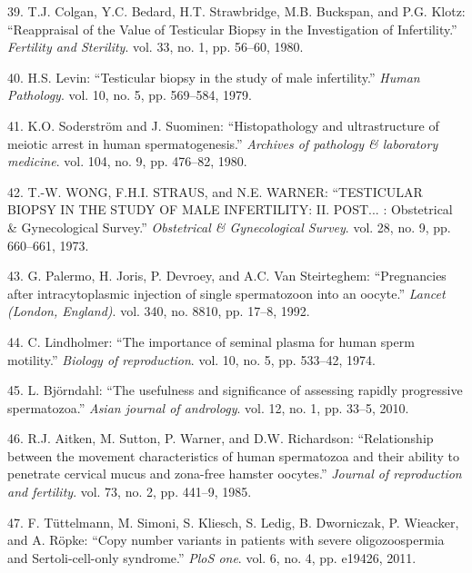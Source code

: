 \documentclass[12pt,twoside]{reedthesis}
\theoremstyle{definition}
\theoremstyle{definition}
\theoremstyle{remark}
\begin{document}
  \hypertarget{ref-Colgan1980}{}
  39. T.J. Colgan, Y.C. Bedard, H.T. Strawbridge, M.B. Buckspan, and P.G.
  Klotz: ``Reappraisal of the Value of Testicular Biopsy in the
  Investigation of Infertility.'' \emph{Fertility and Sterility}. vol. 33,
  no. 1, pp. 56--60, 1980.
  
  \hypertarget{ref-Levin1979}{}
  40. H.S. Levin: ``Testicular biopsy in the study of male infertility.''
  \emph{Human Pathology}. vol. 10, no. 5, pp. 569--584, 1979.
  
  \hypertarget{ref-Soderstrom1980}{}
  41. K.O. Soderström and J. Suominen: ``Histopathology and ultrastructure
  of meiotic arrest in human spermatogenesis.'' \emph{Archives of
  pathology \& laboratory medicine}. vol. 104, no. 9, pp. 476--82, 1980.
  
  \hypertarget{ref-WONG1973}{}
  42. T.-W. WONG, F.H.I. STRAUS, and N.E. WARNER: ``TESTICULAR BIOPSY IN
  THE STUDY OF MALE INFERTILITY: II. POST... : Obstetrical \&
  Gynecological Survey.'' \emph{Obstetrical \& Gynecological Survey}. vol.
  28, no. 9, pp. 660--661, 1973.
  
  \hypertarget{ref-Palermo1992}{}
  43. G. Palermo, H. Joris, P. Devroey, and A.C. Van Steirteghem:
  ``Pregnancies after intracytoplasmic injection of single spermatozoon
  into an oocyte.'' \emph{Lancet (London, England)}. vol. 340, no. 8810,
  pp. 17--8, 1992.
  
  \hypertarget{ref-Lindholmer1974}{}
  44. C. Lindholmer: ``The importance of seminal plasma for human sperm
  motility.'' \emph{Biology of reproduction}. vol. 10, no. 5, pp. 533--42,
  1974.
  
  \hypertarget{ref-Bjorndahl2010}{}
  45. L. Björndahl: ``The usefulness and significance of assessing rapidly
  progressive spermatozoa.'' \emph{Asian journal of andrology}. vol. 12,
  no. 1, pp. 33--5, 2010.
  
  \hypertarget{ref-Aitken1985}{}
  46. R.J. Aitken, M. Sutton, P. Warner, and D.W. Richardson:
  ``Relationship between the movement characteristics of human spermatozoa
  and their ability to penetrate cervical mucus and zona-free hamster
  oocytes.'' \emph{Journal of reproduction and fertility}. vol. 73, no. 2,
  pp. 441--9, 1985.
  
  \hypertarget{ref-Tuttelmann2011}{}
  47. F. Tüttelmann, M. Simoni, S. Kliesch, S. Ledig, B. Dworniczak, P.
  Wieacker, and A. Röpke: ``Copy number variants in patients with severe
  oligozoospermia and Sertoli-cell-only syndrome.'' \emph{PloS one}. vol.
  6, no. 4, pp. e19426, 2011.
  
\end{document}
